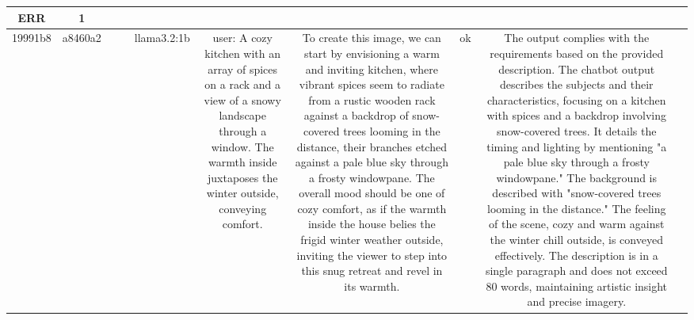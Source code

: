 \begin{table}[h!]
\begin{tabular}{|c|c|c|c|c|c|c|c|c|c|}
ERR & 1\\
\hline
19991b8 & a8460a2 &  &  & llama3.2:1b & user: A cozy kitchen with an array of spices on a rack and a view of a snowy landscape through a window. The warmth inside juxtaposes the winter outside, conveying comfort. & To create this image, we can start by envisioning a warm and inviting kitchen, where vibrant spices seem to radiate from a rustic wooden rack against a backdrop of snow-covered trees looming in the distance, their branches etched against a pale blue sky through a frosty windowpane. The overall mood should be one of cozy comfort, as if the warmth inside the house belies the frigid winter weather outside, inviting the viewer to step into this snug retreat and revel in its warmth. & ok & The output complies with the requirements based on the provided description. The chatbot output describes the subjects and their characteristics, focusing on a kitchen with spices and a backdrop involving snow-covered trees. It details the timing and lighting by mentioning "a pale blue sky through a frosty windowpane." The background is described with "snow-covered trees looming in the distance." The feeling of the scene, cozy and warm against the winter chill outside, is conveyed effectively. The description is in a single paragraph and does not exceed 80 words, maintaining artistic insight and precise imagery. 


\end{tabular}
\end{table}
